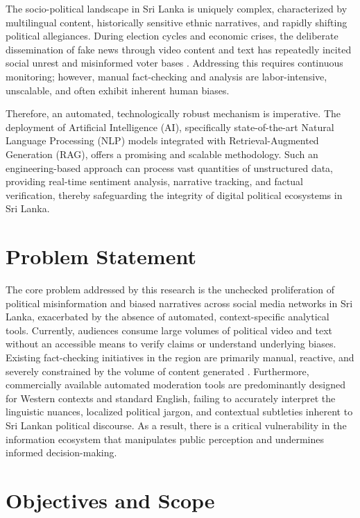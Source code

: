 \documentclass[12pt,a4paper]{report}
\begin{document}
The socio-political landscape in Sri Lanka is uniquely complex, characterized by multilingual content, historically sensitive ethnic narratives, and rapidly shifting political allegiances. During election cycles and economic crises, the deliberate dissemination of fake news through video content and text has repeatedly incited social unrest and misinformed voter bases \cite{udupa2020}. Addressing this requires continuous monitoring; however, manual fact-checking and analysis are labor-intensive, unscalable, and often exhibit inherent human biases.

Therefore, an automated, technologically robust mechanism is imperative. The deployment of Artificial Intelligence (AI), specifically state-of-the-art Natural Language Processing (NLP) models integrated with Retrieval-Augmented Generation (RAG), offers a promising and scalable methodology. Such an engineering-based approach can process vast quantities of unstructured data, providing real-time sentiment analysis, narrative tracking, and factual verification, thereby safeguarding the integrity of digital political ecosystems in Sri Lanka.

\section{Problem Statement}
The core problem addressed by this research is the unchecked proliferation of political misinformation and biased narratives across social media networks in Sri Lanka, exacerbated by the absence of automated, context-specific analytical tools. Currently, audiences consume large volumes of political video and text without an accessible means to verify claims or understand underlying biases. Existing fact-checking initiatives in the region are primarily manual, reactive, and severely constrained by the volume of content generated \cite{hassan2017}. Furthermore, commercially available automated moderation tools are predominantly designed for Western contexts and standard English, failing to accurately interpret the linguistic nuances, localized political jargon, and contextual subtleties inherent to Sri Lankan political discourse. As a result, there is a critical vulnerability in the information ecosystem that manipulates public perception and undermines informed decision-making.

\section{Objectives and Scope}
\end{document}
